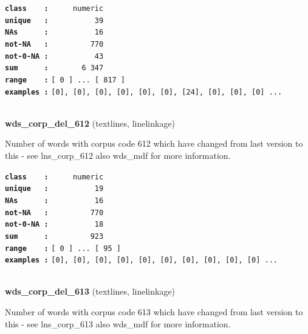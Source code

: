 \documentclass[]{article}
\begin{document}
\textbf{\texttt{class\ \ \ \ :}} \texttt{~~~~~numeric}\\
\textbf{\texttt{unique\ \ \ :}} \texttt{~~~~~~~~~~39}\\
\textbf{\texttt{NAs\ \ \ \ \ \ :}} \texttt{~~~~~~~~~~16}\\
\textbf{\texttt{not-NA\ \ \ :}} \texttt{~~~~~~~~~770}\\
\textbf{\texttt{not-0-NA\ :}} \texttt{~~~~~~~~~~43}\\
\textbf{\texttt{sum\ \ \ \ \ \ :}} \texttt{~~~~~~~6~347}\\
\textbf{\texttt{range\ \ \ \ :}}
\texttt{{[}\ 0\ {]}\ ...\ {[}\ 817\ {]}}\\
\textbf{\texttt{examples\ :}}
\texttt{{[}0{]},\ {[}0{]},\ {[}0{]},\ {[}0{]},\ {[}0{]},\ {[}0{]},\ {[}24{]},\ {[}0{]},\ {[}0{]},\ {[}0{]}\ ...}\\

~

\textbf{wds\_corp\_del\_612} (textlines, linelinkage)

Number of words with corpus code 612 which have changed from last
version to this - see lns\_corp\_612 also wds\_mdf for more information.

\textbf{\texttt{class\ \ \ \ :}} \texttt{~~~~~numeric}\\
\textbf{\texttt{unique\ \ \ :}} \texttt{~~~~~~~~~~19}\\
\textbf{\texttt{NAs\ \ \ \ \ \ :}} \texttt{~~~~~~~~~~16}\\
\textbf{\texttt{not-NA\ \ \ :}} \texttt{~~~~~~~~~770}\\
\textbf{\texttt{not-0-NA\ :}} \texttt{~~~~~~~~~~18}\\
\textbf{\texttt{sum\ \ \ \ \ \ :}} \texttt{~~~~~~~~~923}\\
\textbf{\texttt{range\ \ \ \ :}}
\texttt{{[}\ 0\ {]}\ ...\ {[}\ 95\ {]}}\\
\textbf{\texttt{examples\ :}}
\texttt{{[}0{]},\ {[}0{]},\ {[}0{]},\ {[}0{]},\ {[}0{]},\ {[}0{]},\ {[}0{]},\ {[}0{]},\ {[}0{]},\ {[}0{]}\ ...}\\

~

\textbf{wds\_corp\_del\_613} (textlines, linelinkage)

Number of words with corpus code 613 which have changed from last
version to this - see lns\_corp\_613 also wds\_mdf for more information.
\end{document}
